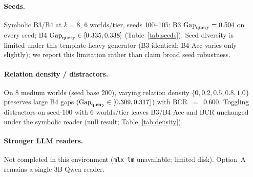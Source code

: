 \paragraph{Seeds.} Symbolic B3/B4 at $k{=}8$, 6 worlds/tier, seeds 100--105: B3 $\mathrm{Gap}_{\mathrm{query}}=0.504$ on every seed; B4 $\mathrm{Gap}_{\mathrm{query}}\in[0.335,0.338]$ (Table~\ref{tab:seeds}). Seed diversity is limited under this template-heavy generator (B3 identical; B4 Acc varies only slightly); we report this limitation rather than claim broad seed robustness.

\paragraph{Relation density / distractors.} On 8 medium worlds (seed base 200), varying relation density $\{0,0.2,0.5,0.8,1.0\}$ preserves large B4 gaps ($\mathrm{Gap}_{\mathrm{query}}\in[0.309,0.317]$) with BCR~$=$~0.600. Toggling distractors on seed-100 with 6 worlds/tier leaves B3/B4 Acc and BCR unchanged under the symbolic reader (null result; Table~\ref{tab:density}).

\paragraph{Stronger LLM readers.} Not completed in this environment (\texttt{mlx\_lm} unavailable; limited disk). Option~A remains a single 3B Qwen reader.
